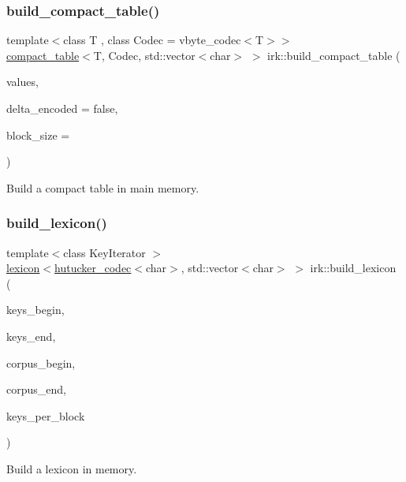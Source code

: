 \subsubsection{\texorpdfstring{build\+\_\+compact\+\_\+table()}{build\_compact\_table()}}
{\footnotesize\ttfamily template$<$class T , class Codec  = vbyte\+\_\+codec$<$\+T$>$$>$ \\
\mbox{\hyperlink{classirk_1_1compact__table}{compact\+\_\+table}}$<$T, Codec, std\+::vector$<$char$>$ $>$ irk\+::build\+\_\+compact\+\_\+table (\begin{DoxyParamCaption}\item[{const std\+::vector$<$ T $>$ \&}]{values,  }\item[{bool}]{delta\+\_\+encoded = {\ttfamily false},  }\item[{std\+::uint32\+\_\+t}]{block\+\_\+size = {} }\end{DoxyParamCaption})}



Build a compact table in main memory. 

\mbox{\label{namespaceirk_a7f10e6248e9c76245e3af6a7725869b1}} 
\subsubsection{\texorpdfstring{build\+\_\+lexicon()}{build\_lexicon()}\hspace{0.1cm}{\footnotesize\ttfamily [1/3]}}
{\footnotesize\ttfamily template$<$class Key\+Iterator $>$ \\
\mbox{\hyperlink{classirk_1_1lexicon}{lexicon}}$<$\mbox{\hyperlink{classirk_1_1hutucker__codec}{hutucker\+\_\+codec}}$<$char$>$, std\+::vector$<$char$>$ $>$ irk\+::build\+\_\+lexicon (\begin{DoxyParamCaption}\item[{Key\+Iterator}]{keys\+\_\+begin,  }\item[{Key\+Iterator}]{keys\+\_\+end,  }\item[{Key\+Iterator}]{corpus\+\_\+begin,  }\item[{Key\+Iterator}]{corpus\+\_\+end,  }\item[{int}]{keys\+\_\+per\+\_\+block }\end{DoxyParamCaption})}

Build a lexicon in memory.


